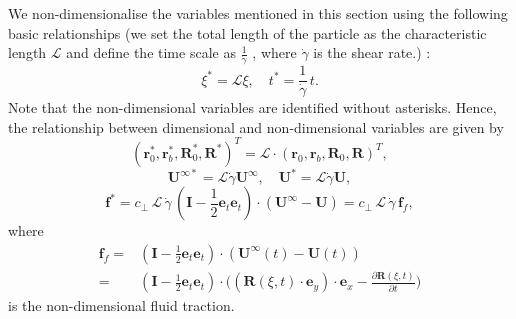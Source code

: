 \documentclass[a4paper,12pt]{report}
\begin{document}
We non-dimensionalise the variables mentioned in this section using the following basic relationships (we set the total length
of the particle as the characteristic length $\mathcal{L}$ and define the time scale as $\frac{1}{\dot{\gamma}}$ , where $\dot{\gamma}$ is the shear rate.) :
\begin{equation}
	\label{eqn:25}
	\xi^*=\mathcal{L}\xi, \quad t^*=\frac{1}{\dot{\gamma}}\,t.
\end{equation}
Note that the non-dimensional variables are identified without asterisks.
Hence, the relationship between dimensional and non-dimensional variables are given by
\begin{equation}
	\label{eqn:26}
	(\mathbf{r}_0^*, \mathbf{r}_b^*, \mathbf{R}_0^*, \mathbf{R}^*)^T=\mathcal{L}\cdot(\mathbf{r}_0, \mathbf{r}_b, \mathbf{R}_0, \mathbf{R})^T,
\end{equation}
\begin{equation}
	\label{eqn:27}
	\mathbf{U}^{\infty*}=\mathcal{L}\dot{\gamma}\mathbf{U}^{\infty}, \quad \mathbf{U}^*=\mathcal{L}\dot{\gamma}\mathbf{U},
\end{equation}
\begin{equation}
	\label{eqn:28}
	\mathbf{f}^*=c_\perp\,\mathcal{L}\,\dot{\gamma}\,\left(\mathbf{I}-\frac{1}{2}\mathbf{e}_t\mathbf{e}_t\right)\cdot(\mathbf{U}^{\infty}-\mathbf{U})=c_\perp\,\mathcal{L}\,\dot{\gamma}\,\mathbf{f}_{f},
\end{equation}
where 
\begin{equation}
	\label{eqn:101}
	\begin{aligned}
	\mathbf{f}_f=&\left(\mathbf{I}-\frac{1}{2}\mathbf{e}_t\mathbf{e}_t\right)\cdot(\mathbf{U}^{\infty}(t)-\mathbf{U}(t))\\
	=&\left(\mathbf{I}-\frac{1}{2}\mathbf{e}_t\mathbf{e}_t\right)\cdot\Big((\bm{\bm{R}}(\xi,t)\cdot\textbf{e}_y)\cdot\textbf{e}_x-\frac{\partial\textbf{R}(\xi,t)}{\partial t}\Big)
	\end{aligned}
\end{equation}
is the non-dimensional fluid traction. 
\end{document}
